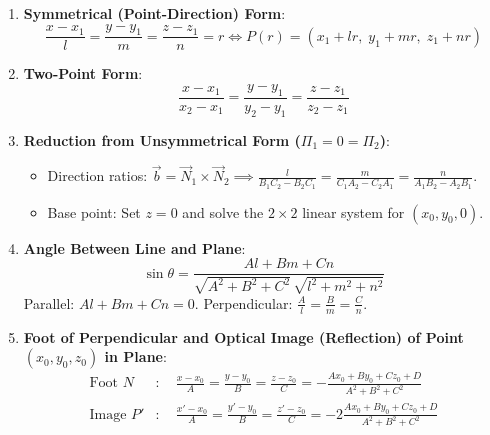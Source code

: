\begin{theorembox}
\begin{enumerate}
    \item \textbf{Symmetrical (Point-Direction) Form}:
    \begin{equation}
        \boxed{\frac{x - x_1}{l} = \frac{y - y_1}{m} = \frac{z - z_1}{n} = r} \iff P(r) = (x_1 + lr, \; y_1 + mr, \; z_1 + nr)
    \end{equation}
    \item \textbf{Two-Point Form}:
    \begin{equation}
        \boxed{\frac{x - x_1}{x_2 - x_1} = \frac{y - y_1}{y_2 - y_1} = \frac{z - z_1}{z_2 - z_1}}
    \end{equation}
    \item \textbf{Reduction from Unsymmetrical Form ($\Pi_1 = 0 = \Pi_2$)}:
    \begin{itemize}
        \item Direction ratios: $\displaystyle \vec{b} = \vec{N}_1 \times \vec{N}_2 \implies \frac{l}{B_1 C_2 - B_2 C_1} = \frac{m}{C_1 A_2 - C_2 A_1} = \frac{n}{A_1 B_2 - A_2 B_1}$.
        \item Base point: Set $z = 0$ and solve the $2 \times 2$ linear system for $(x_0, y_0, 0)$.
    \end{itemize}
    \item \textbf{Angle Between Line and Plane}:
    \begin{equation}
        \boxed{\sin\theta = \frac{Al + Bm + Cn}{\sqrt{A^2 + B^2 + C^2}\,\sqrt{l^2 + m^2 + n^2}}}
    \end{equation}
    Parallel: $Al + Bm + Cn = 0$. \quad Perpendicular: $\frac{A}{l} = \frac{B}{m} = \frac{C}{n}$.
    \item \textbf{Foot of Perpendicular and Optical Image (Reflection) of Point $(x_0, y_0, z_0)$ in Plane}:
    \begin{align}
        \text{Foot } N &: \quad \frac{x - x_0}{A} = \frac{y - y_0}{B} = \frac{z - z_0}{C} = -\frac{Ax_0 + By_0 + Cz_0 + D}{A^2 + B^2 + C^2} \\
        \text{Image } P' &: \quad \frac{x' - x_0}{A} = \frac{y' - y_0}{B} = \frac{z' - z_0}{C} = -2\frac{Ax_0 + By_0 + Cz_0 + D}{A^2 + B^2 + C^2}
    \end{align}
\end{enumerate}
\end{theorembox}

